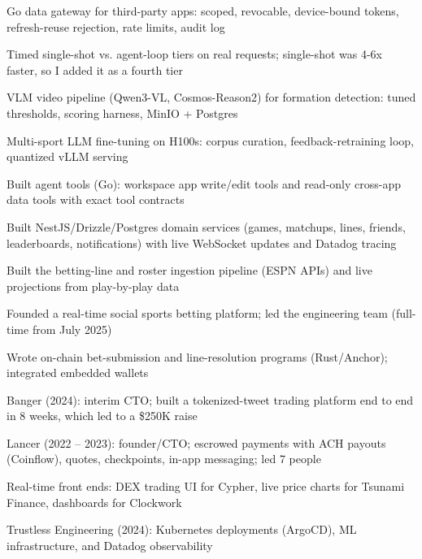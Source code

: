 \documentclass[print]{jack-resume}
\begin{document}
\begin{tightemize}
    \item Go data gateway for third-party apps: scoped, revocable, device-bound tokens, refresh-reuse rejection, rate limits, audit log
    \item Timed single-shot vs. agent-loop tiers on real requests; single-shot was 4-6x faster, so I added it as a fourth tier
    \item VLM video pipeline (Qwen3-VL, Cosmos-Reason2) for formation detection: tuned thresholds, scoring harness, MinIO + Postgres
    \item Multi-sport LLM fine-tuning on H100s: corpus curation, feedback-retraining loop, quantized vLLM serving
    \item Built agent tools (Go): workspace app write/edit tools and read-only cross-app data tools with exact tool contracts
\end{tightemize}
\sectionsep

\begin{tightemize}
    \item Built NestJS/Drizzle/Postgres domain services (games, matchups, lines, friends, leaderboards, notifications) with live WebSocket updates and Datadog tracing
    \item Built the betting-line and roster ingestion pipeline (ESPN APIs) and live projections from play-by-play data
    \item Founded a real-time social sports betting platform; led the engineering team (full-time from July 2025)
    \item Wrote on-chain bet-submission and line-resolution programs (Rust/Anchor); integrated embedded wallets
\end{tightemize}
\sectionsep

\begin{tightemize}
    \item Banger (2024): interim CTO; built a tokenized-tweet trading platform end to end in 8 weeks, which led to a \$250K raise
    \item Lancer (2022 -- 2023): founder/CTO; escrowed payments with ACH payouts (Coinflow), quotes, checkpoints, in-app messaging; led 7 people
    \item Real-time front ends: DEX trading UI for Cypher, live price charts for Tsunami Finance, dashboards for Clockwork
    \item Trustless Engineering (2024): Kubernetes deployments (ArgoCD), ML infrastructure, and Datadog observability
\end{tightemize}
\sectionsep
\end{document}
